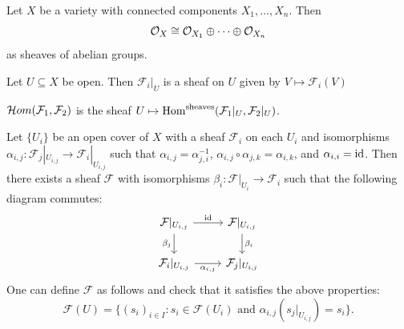 \begin{example}
  Let $X$ be a variety with
  connected components $X_1, \dots, X_n$.
  Then
  \[
    \mathcal{O}_X \cong \mathcal{O}_{X_1} \oplus \cdots \oplus \mathcal{O}_{X_n}
  \]
  as sheaves of abelian groups.
\end{example}

\begin{definition}
  Let $U \subseteq X$ be open.
  Then $\mathcal{F}_i|_U$
  is a sheaf on $U$ given
  by $V \mapsto \mathcal{F}_i(V)$
\end{definition}

\begin{definition}
  $\mathcal{H}om(\mathcal{F}_1, \mathcal{F}_2)$
  is the sheaf
  $U \mapsto \operatorname{Hom}^{\mathrm{sheaves}}(\mathcal{F}_1|_U, \mathcal{F}_2|_U)$.
\end{definition}

\begin{definition}[Gluing]
  Let $\{U_i\}$ be an open cover of
  $X$ with a sheaf
  $\mathcal{F}_i$ on each
  $U_i$ and
  isomorphisms
  $\alpha_{i, j} : \mathcal{F}_j|_{U_{i, j}} \to \mathcal{F}_i|_{U_{i, j}}$
  such that $\alpha_{i, j} = \alpha_{j, i}^{-1}$,
  $\alpha_{i, j} \circ \alpha_{j, k} = \alpha_{i, k}$, and
  $\alpha_{i, i} = \operatorname{id}$. Then there
  exists a sheaf $\mathcal{F}$
  with isomorphisms
  $\beta_i : \mathcal{F}|_{U_i} \to \mathcal{F}_i$
  such that the following
  diagram commutes:
  \[
    \begin{tikzcd}
      \mathcal{F}|_{U_{i, j}}
      \ar[r, "\id"] \ar[d, swap, "\beta_j"] & \mathcal{F}|_{U_{i, j}} \ar[d, "\beta_i"] \\
      \mathcal{F}_i|_{U_{i, j}} \ar[r, "\alpha_{i, j}", swap]
      & \mathcal{F}_j|_{U_{i, j}}
    \end{tikzcd}
  \]
  One can define $\mathcal{F}$
  as follows and check that it
  satisfies the above properties:
  \[
    \mathcal{F}(U)
    = \{(s_i)_{i \in I} : s_i \in \mathcal{F}(U_i) \text{ and } \alpha_{i, j}(s_j|_{U_{i, j}}) = s_i\}.
  \]
\end{definition}
